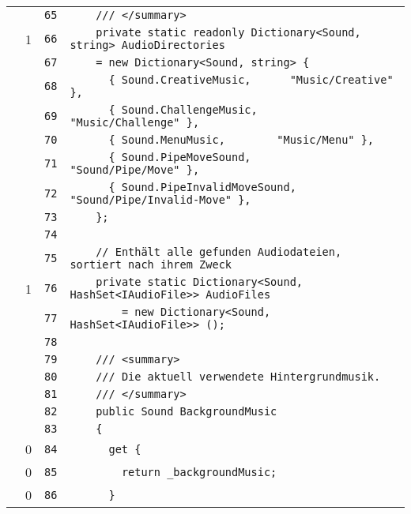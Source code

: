 \documentclass[a4paper,10pt]{article}
\begin{document}
\begin{longtable}[l]{lrrl}
\cellcolor{gray} &  & \verb~65~ & \verb~    /// </summary>~\\
\cellcolor{green} & 1 & \verb~66~ & \verb~    private static readonly Dictionary<Sound, string> AudioDirectories~\\
\cellcolor{gray} &  & \verb~67~ & \verb~    = new Dictionary<Sound, string> {~\\
\cellcolor{gray} &  & \verb~68~ & \verb~      { Sound.CreativeMusic,      "Music/Creative" },~\\
\cellcolor{gray} &  & \verb~69~ & \verb~      { Sound.ChallengeMusic,      "Music/Challenge" },~\\
\cellcolor{gray} &  & \verb~70~ & \verb~      { Sound.MenuMusic,        "Music/Menu" },~\\
\cellcolor{gray} &  & \verb~71~ & \verb~      { Sound.PipeMoveSound,      "Sound/Pipe/Move" },~\\
\cellcolor{gray} &  & \verb~72~ & \verb~      { Sound.PipeInvalidMoveSound,  "Sound/Pipe/Invalid-Move" },~\\
\cellcolor{gray} &  & \verb~73~ & \verb~    };~\\
\cellcolor{gray} &  & \verb~74~ & \verb~~\\
\cellcolor{gray} &  & \verb~75~ & \verb~    // Enthält alle gefunden Audiodateien, sortiert nach ihrem Zweck~\\
\cellcolor{green} & 1 & \verb~76~ & \verb~    private static Dictionary<Sound, HashSet<IAudioFile>> AudioFiles~\\
\cellcolor{gray} &  & \verb~77~ & \verb~        = new Dictionary<Sound, HashSet<IAudioFile>> ();~\\
\cellcolor{gray} &  & \verb~78~ & \verb~~\\
\cellcolor{gray} &  & \verb~79~ & \verb~    /// <summary>~\\
\cellcolor{gray} &  & \verb~80~ & \verb~    /// Die aktuell verwendete Hintergrundmusik.~\\
\cellcolor{gray} &  & \verb~81~ & \verb~    /// </summary>~\\
\cellcolor{gray} &  & \verb~82~ & \verb~    public Sound BackgroundMusic~\\
\cellcolor{gray} &  & \verb~83~ & \verb~    {~\\
\cellcolor{red} & 0 & \verb~84~ & \verb~      get {~\\
\cellcolor{red} & 0 & \verb~85~ & \verb~        return _backgroundMusic;~\\
\cellcolor{red} & 0 & \verb~86~ & \verb~      }~\\

\end{longtable}
\end{document}
